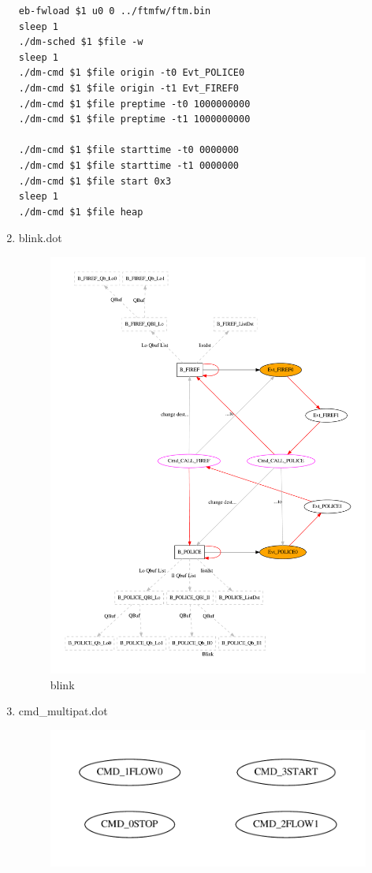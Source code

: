 \documentclass[12pt,a4paper]{report}
\begin{document}
\begin{enumerate}
\begin{verbatim}
eb-fwload $1 u0 0 ../ftmfw/ftm.bin
sleep 1
./dm-sched $1 $file -w
sleep 1
./dm-cmd $1 $file origin -t0 Evt_POLICE0
./dm-cmd $1 $file origin -t1 Evt_FIREF0
./dm-cmd $1 $file preptime -t0 1000000000
./dm-cmd $1 $file preptime -t1 1000000000

./dm-cmd $1 $file starttime -t0 0000000
./dm-cmd $1 $file starttime -t1 0000000
./dm-cmd $1 $file start 0x3
sleep 1
./dm-cmd $1 $file heap
\end{verbatim}
\item blink.dot
    \begin{figure}
        \centering 
        \includegraphics*[width=1.0\textwidth,keepaspectratio]{TestPattern/blink.pdf}
        \caption{blink}
        \label{fig:blink}
    \end{figure}
\item cmd\_multipat.dot
    \begin{figure}
        \centering 
        \includegraphics*[width=1.0\textwidth,keepaspectratio]{TestPattern/cmd_multipat.pdf}

\end{figure}
\end{enumerate}
\end{document}

